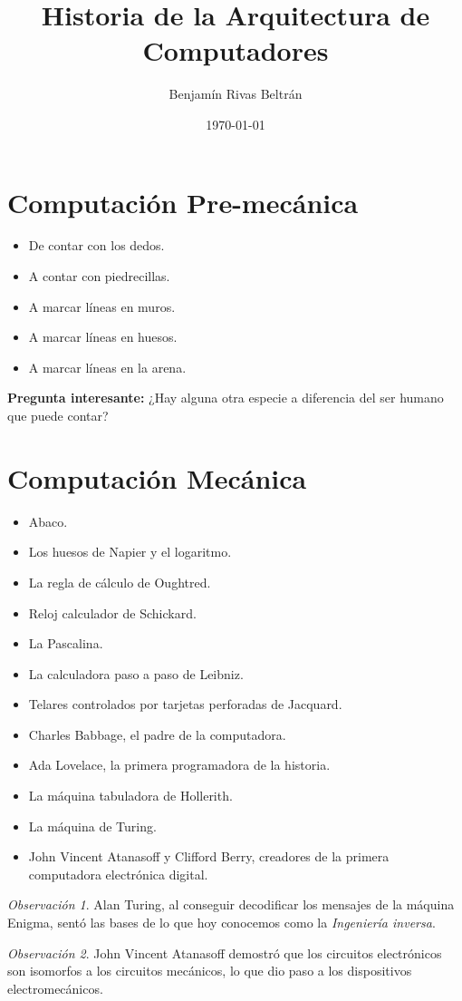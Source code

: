 \documentclass{article}
\title{Historia de la Arquitectura de Computadores}
\author{Benjamín Rivas Beltrán}
\date{\today}
\theoremstyle{remark}
\newtheorem{remark}{Observación}
\begin{document}
\maketitle

\section{Computación Pre-mecánica}

\begin{itemize}
    \item De contar con los dedos.
    \item A contar con piedrecillas.
    \item A marcar líneas en muros.
    \item A marcar líneas en huesos.
    \item A marcar líneas en la arena.
\end{itemize}

\textbf{Pregunta interesante:} ¿Hay alguna otra especie a diferencia del ser humano que puede contar?

\section{Computación Mecánica}

\begin{itemize}
    \item Abaco.
    \item Los huesos de Napier y el logaritmo.
    \item La regla de cálculo de Oughtred.
    \item Reloj calculador de Schickard.
    \item La Pascalina.
    \item La calculadora paso a paso de Leibniz.
    \item Telares controlados por tarjetas perforadas de Jacquard.
    \item Charles Babbage, el padre de la computadora.
    \item Ada Lovelace, la primera programadora de la historia.
    \item La máquina tabuladora de Hollerith.
    \item La máquina de Turing.
    \item John Vincent Atanasoff y Clifford Berry, creadores de la primera computadora electrónica digital.
\end{itemize}

\begin{remark}
Alan Turing, al conseguir decodificar los mensajes de la máquina Enigma, sentó las bases de lo que hoy conocemos como la \textit{Ingeniería inversa}.
\end{remark}

\begin{remark}
John Vincent Atanasoff demostró que los circuitos electrónicos son isomorfos a los circuitos mecánicos, lo que dio paso a los dispositivos electromecánicos. 
\end{remark}
\end{document}
